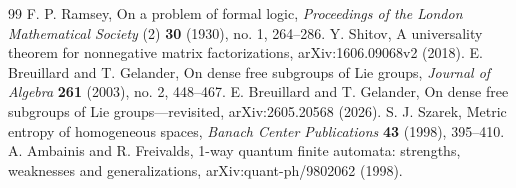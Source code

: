\begin{thebibliography}{99}
 F. P. Ramsey, On a problem of formal logic, \emph{Proceedings of the London Mathematical Society} (2) \textbf{30} (1930), no. 1, 264--286.
 Y. Shitov, A universality theorem for nonnegative matrix factorizations, arXiv:1606.09068v2 (2018).
 E. Breuillard and T. Gelander, On dense free subgroups of Lie groups, \emph{Journal of Algebra} \textbf{261} (2003), no. 2, 448--467.
 E. Breuillard and T. Gelander, On dense free subgroups of Lie groups---revisited, arXiv:2605.20568 (2026).
 S. J. Szarek, Metric entropy of homogeneous spaces, \emph{Banach Center Publications} \textbf{43} (1998), 395--410.
 A. Ambainis and R. Freivalds, 1-way quantum finite automata: strengths, weaknesses and generalizations, arXiv:quant-ph/9802062 (1998).
\end{thebibliography}
